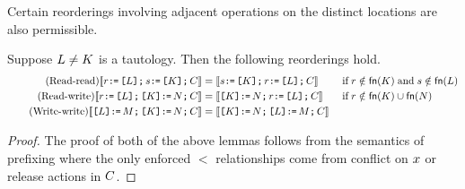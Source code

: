Certain reorderings involving adjacent operations on the distinct locations
are also permissible. 

\begin{lemma}%
  Suppose $\cExp\neq\dExp$ is a tautology.  Then the following reorderings hold.
  \begin{align*}
    \tag{Read-read}
    \sem{\aReg \GETS \REF{\cExp} \SEMI \bReg \GETS \REF{\dExp} \SEMI \aCmd} &=
    \sem{\bReg \GETS \REF{\dExp} \SEMI \aReg \GETS \REF{\cExp} \SEMI \aCmd}
    &&\textif \aReg\notin\free(\dExp) \textand \bReg\notin\free(\cExp)
    \\
    \tag{Read-write}
    \sem{\aReg \GETS \REF{\cExp} \SEMI \REF{\dExp} \GETS \bExp \SEMI \aCmd} &=
    \sem{\REF{\dExp} \GETS \bExp \SEMI \aReg \GETS \REF{\cExp} \SEMI \aCmd}
    &&\textif \aReg\notin\free(\dExp) \cup\free(\bExp)
    \\
    \tag{Write-write}
    \sem{\REF{\cExp} \GETS \aExp \SEMI \REF{\dExp} \GETS \bExp \SEMI \aCmd} &=
    \sem{\REF{\dExp} \GETS \bExp \SEMI \REF{\cExp} \GETS \aExp \SEMI \aCmd}
  \end{align*}
\begin{proof}
The proof of both of the above lemmas follows from the semantics of prefixing where the only enforced $\lt$ relationships come from conflict on $\aLoc$ or release actions in $\aCmd$.
\end{proof}
\end{lemma}

